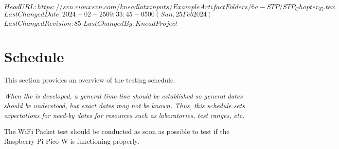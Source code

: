\svnidlong
{$HeadURL: https://svn.riouxsvn.com/kneadlatxinputs/ExampleArtifactFolders/6a-STP/STP_Chapter_05.tex $}
{$LastChangedDate: 2024-02-25 09:33:45 -0500 (Sun, 25 Feb 2024) $}
{$LastChangedRevision: 85 $}
{$LastChangedBy: KneadProject $}


\chapter{Schedule}
\label{loc:Schedule}

This section provides an overview of the testing schedule.

{\em When the \STP is developed, a general time line should be established so general dates should be understood, but exact dates may not be known.
Thus, this schedule sets expectations for need-by dates for resources such as laboratories, test ranges, etc.}

The WiFi Packet test should be conducted as soon as possible to test if the Raspberry Pi Pico W is functioning properly.